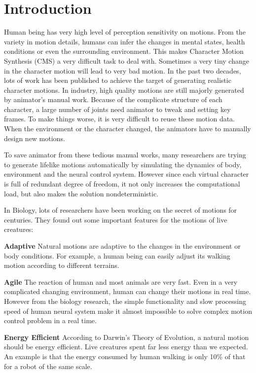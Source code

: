 \section{Introduction}

Human being has very high level of perception sensitivity on motions. From the variety in motion details, humans can infer the changes in mental states, health conditions or even the surrounding environment. This makes Character Motion Synthesis (CMS) a very difficult task to deal with. Sometimes a very tiny change in the character motion will lead to very bad motion. In the past two decades, lots of work has been published to achieve the target of generating realistic character motions. In industry, high quality motions are still majorly generated by animator's manual work. Because of the complicate structure of each character, a large number of joints need animator to tweak and setting key frames. To make things worse, it is very difficult to reuse these motion data. When the environment or the character changed, the animators have to manually design new motions.

To save animator from these tedious manual works, many researchers are trying to generate lifelike motions automatically by simulating the dynamics of body, environment and the neural control system. However since each virtual character is full of redundant degree of freedom, it not only increases the computational load, but also makes the solution nondeterministic. 

In Biology, lots of researchers have been working on the secret of motions for centuries. They found out some important features for the motions of live creatures:

\textbf{Adaptive} 
Natural motions are adaptive to the changes in the environment or body conditions. For example, a human being can easily adjust its walking motion according to different terrains.

\textbf{Agile}
The reaction of human and most animals are very fast. Even in a very complicated changing environment, human can change their motions in real time. However from the biology research, the simple functionality and slow processing speed of human neural system make it almost impossible to solve complex motion control problem in a real time. 

\textbf{Energy Efficient}
According to Darwin's Theory of Evolution, a natural motion should be energy efficient. Live creatures spent far less energy than we expected. An example is that the energy consumed by human walking is only 10\% of that for a robot of the same scale.

